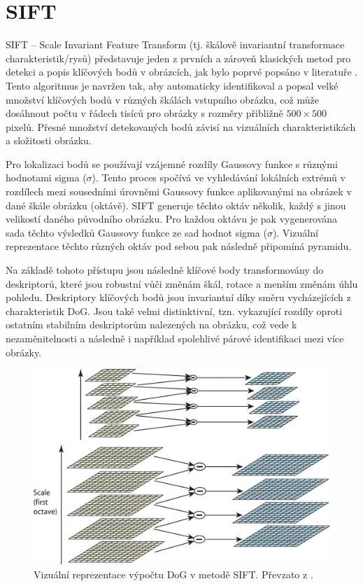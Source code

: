 \section{SIFT}
\label{sec:Chapter21}
SIFT -- Scale Invariant Feature Transform (tj. škálově invariantní transformace charakteristik/rysů) představuje jeden z prvních a zároveň klasických metod pro detekci a popis klíčových bodů v obrázcích, jak bylo poprvé popsáno v literatuře \cite{sift}. Tento algoritmus je navržen tak, aby automaticky identifikoval a popsal velké množství klíčových bodů v různých škálách vstupního obrázku, což může dosáhnout počtu v řádech tisíců pro obrázky s rozměry přibližně $500\times500$ pixelů. Přesné množství detekovaných bodů závisí na vizuálních charakteristikách a složitosti obrázku.

Pro lokalizaci bodů se používají vzájemné rozdíly Gaussovy funkce s různými hodnotami sigma ($\sigma$). Tento proces spočívá ve vyhledávání lokálních extrémů v rozdílech mezi sousedními úrovněmi Gaussovy funkce aplikovanými na obrázek v dané škále obrázku (oktávě). SIFT generuje těchto oktáv několik, každý s jinou velikostí daného původního obrázku. Pro každou oktávu je pak vygenerována sada těchto výsledků Gaussovy funkce ze sad hodnot sigma ($\sigma$). Vizuální reprezentace těchto různých oktáv pod sebou pak následně připomíná pyramidu.

Na základě tohoto přístupu jsou následně klíčové body transformovány do deskriptorů, které jsou robustní vůči změnám škál, rotace a menším změnám úhlu pohledu. Deskriptory klíčových bodů jsou invariantní díky směru vycházejících z charakteristik DoG. Jsou také velmi distinktivní, tzn. vykazující rozdíly oproti ostatním stabilním deskriptorům nalezených na obrázku, což vede k nezaměnitelnosti a následně i například spolehlivé párové identifikaci mezi více obrázky.

\begin{figure}[h]
\centering
\includegraphics[width=1.0\textwidth,keepaspectratio]{Figures/sift_dog.pdf}
\caption[Vizuální reprezentace výpočtu DoG v metodě SIFT]{Vizuální reprezentace výpočtu DoG v metodě SIFT. Převzato z \cite{sift}.}
\label{fig:sift_dog}
\end{figure}

